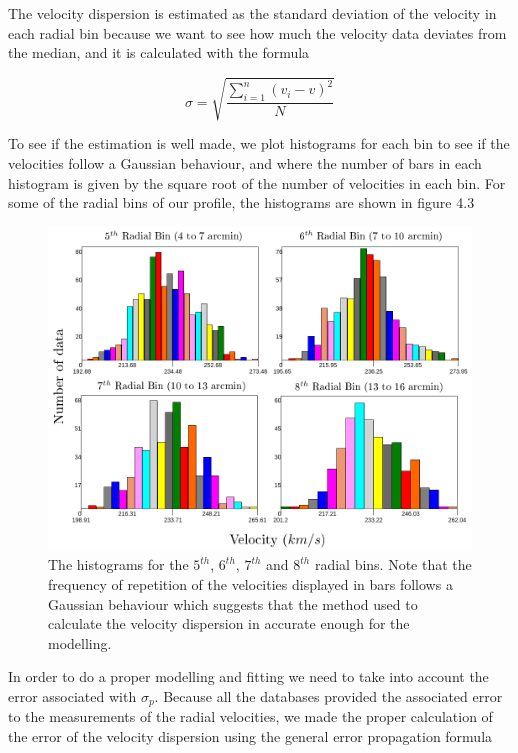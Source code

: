 The velocity dispersion is estimated as the standard deviation of the velocity in each radial bin because we want to see how much the velocity data deviates from the median, and it is calculated with the formula

\begin{equation}
\sigma = \sqrt{\frac{\sum_{i=1}^{n}\left(v_{i}-v\right)^{2}}{N}}
\end{equation}

To see if the estimation is well made, we plot histograms for each bin to see if the velocities follow a Gaussian behaviour, and where the number of bars in each histogram is given by the square root of the number of velocities in each bin. For some of the radial bins of our profile, the histograms are shown in figure 4.3

\begin{figure}[H]
\centering
\includegraphics[width=15cm]{images/bines.png}
\caption[Histograms for some of the radial bins in our profile]{The histograms for the $5^{th}$, $6^{th}$, $7^{th}$ and $8^{th}$ radial bins. Note that the frequency of repetition of the velocities displayed in bars follows a Gaussian behaviour which suggests that the method used to calculate the velocity dispersion in accurate enough for the modelling.}
\end{figure}

In order to do a proper modelling and fitting we need to take into account the error associated with $\sigma_{p}$. Because all the databases provided the associated error to the measurements of the radial velocities, we made the proper calculation of the error of the velocity dispersion using the general error propagation formula


